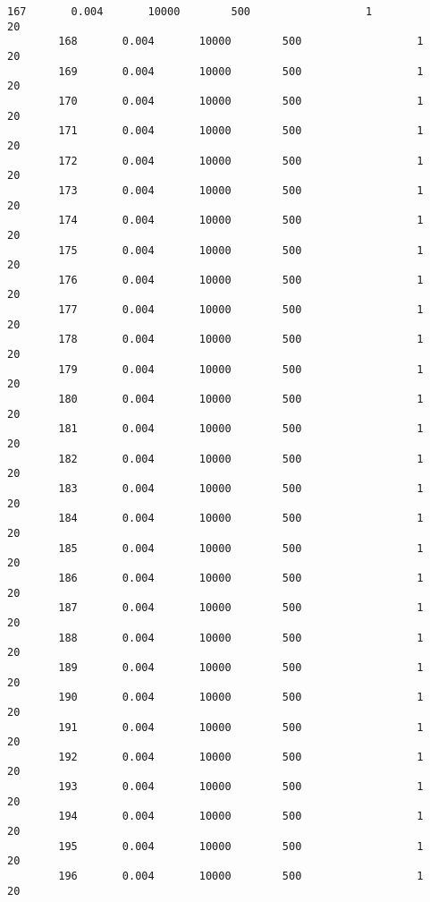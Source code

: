 \documentclass[11pt]{article}
\begin{document}
\begin{Verbatim}[commandchars=\\\{\}]
        167       0.004       10000        500                  1            20   
        168       0.004       10000        500                  1            20   
        169       0.004       10000        500                  1            20   
        170       0.004       10000        500                  1            20   
        171       0.004       10000        500                  1            20   
        172       0.004       10000        500                  1            20   
        173       0.004       10000        500                  1            20   
        174       0.004       10000        500                  1            20   
        175       0.004       10000        500                  1            20   
        176       0.004       10000        500                  1            20   
        177       0.004       10000        500                  1            20   
        178       0.004       10000        500                  1            20   
        179       0.004       10000        500                  1            20   
        180       0.004       10000        500                  1            20   
        181       0.004       10000        500                  1            20   
        182       0.004       10000        500                  1            20   
        183       0.004       10000        500                  1            20   
        184       0.004       10000        500                  1            20   
        185       0.004       10000        500                  1            20   
        186       0.004       10000        500                  1            20   
        187       0.004       10000        500                  1            20   
        188       0.004       10000        500                  1            20   
        189       0.004       10000        500                  1            20   
        190       0.004       10000        500                  1            20   
        191       0.004       10000        500                  1            20   
        192       0.004       10000        500                  1            20   
        193       0.004       10000        500                  1            20   
        194       0.004       10000        500                  1            20   
        195       0.004       10000        500                  1            20   
        196       0.004       10000        500                  1            20   
        

\end{Verbatim}
\end{document}
